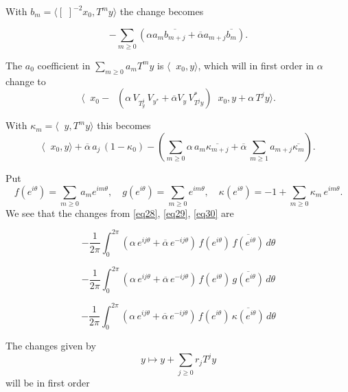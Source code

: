 \documentclass[12pt,oneside,reqno]{amsart}
\theoremstyle{definition}
\DeclareMathOperator*{\VV}{[\,\, ]^{-1}}
\begin{document}
With $b_m = \langle [\, \,]^{-2} x_0, T^m y\rangle$ the change becomes

\begin{equation}\label{eq29}
	- \sum_{m \ge 0} \left( \alpha a_m \overline{b_{m+j}} + \overline{\alpha} a_{m+j} \overline{b_m}\right).	
\end{equation}

The $a_0$ coefficient in $\displaystyle \sum_{m\ge 0} a_m T^m y$ is $\langle \VV x_0, y\rangle$, which will in first order in $\alpha$ change to
$$\langle \VV x_0 - \VV \left( \alpha \, V_{T_y^j} \,V_{y^*} + \overline{\alpha} V_y \, V^*_{T^jy} \right) \VV x_0, y + \alpha \, T^j y \rangle.$$

With $\kappa_m = \langle \VV y, T^m y\rangle$ this becomes
\begin{equation}\label{eq30}
	\langle \VV x_0, y \rangle + \overline{\alpha} \, a_j \, (1 - \kappa_0) - \left( \sum_{m \ge 0} \alpha \, a_m \overline{\kappa_{m+j}} + \overline{\alpha} \, \sum_{m \ge 1} a_{m+j} \overline{\kappa_m}\right).
\end{equation}

Put 
$$f(e^{i \theta}) = \sum_{m \ge 0} a_m e^{i m \theta}, \quad g(e^{i \theta}) = \sum_{m \ge 0} e^{i m \theta}, \quad \kappa(e^{i \theta}) = -1 + \sum_{m \ge 0} \kappa_m \, e^{i m \theta}.$$
We see that the changes from \eqref{eq28}, \eqref{eq29}, \eqref{eq30} are

\begin{equation}\label{eq28prime}\tag{28$^\prime$}
-\frac{1}{2\pi} \int_{0}^{2\pi} \left(\alpha \, e^{i j \theta} + \overline{\alpha} \, e^{- i j \theta}\right)\, f(e^{i\theta}) \, \overline{f(e^{i\theta})} \, d\theta
\end{equation}

\begin{equation}\label{eq29prime}\tag{29$^\prime$}
-\frac{1}{2\pi} \int_{0}^{2\pi} \left(\alpha \, e^{i j \theta} + \overline{\alpha} \, e^{- i j \theta}\right)\, f(e^{i\theta}) \, \overline{g(e^{i\theta})} \, d\theta
\end{equation}

\begin{equation}\label{eq30prime}\tag{30$^\prime$}
	-\frac{1}{2\pi} \int_{0}^{2\pi} \left(\alpha \, e^{i j \theta} + \overline{\alpha} \, e^{- i j \theta}\right)\, f(e^{i\theta}) \, \overline{\kappa (e^{i\theta})} \, d\theta
\end{equation}

The changes given by 
$$y \mapsto y + \sum_{j \ge 0} r_j T^j y$$ will be in first order 
\end{document}
